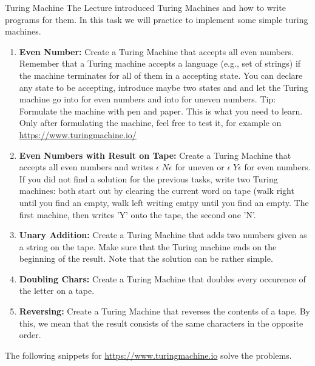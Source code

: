 \begin{task}{Turing Machine}{}{}
The Lecture introduced Turing Machines and how to write programs for
them. In this task we will practice to implement some simple turing
machines.
\begin{enumerate}
\item{\textbf{Even Number:} Create a Turing Machine that accepts all even numbers. Remember that a Turing machine accepts a language (e.g., set of strings) if the machine terminates for all of them in a accepting state. You can declare any state to be accepting, introduce maybe two states  and  and let the Turing machine go into  for even numbers and into  for uneven numbers.
  Tip: Formulate the machine with pen and paper. This is what you need to learn. Only after formulating the machine, feel free to test it, for example on \url{https://www.turingmachine.io/}}
  

  \item{\textbf{Even Numbers with Result on Tape:}
  Create a Turing Machine that accepts all even numbers and writes \(\epsilon \; N \epsilon\) for uneven or
  \(\epsilon \; Y\epsilon\) for even numbers. If you did not find a solution for the previous tasks, write
  two Turing machines: both start out by clearing the current word on tape (walk right until you find an empty, walk left writing emtpy until you find an empty. The first machine, then writes 'Y' onto the tape, the second one 'N'. 
  }

  \item{\textbf{Unary Addition:}
    Create a Turing Machine that adds two numbers given as a string  on the tape. Make sure that the Turing machine ends on the beginning of the result. Note that the solution can be rather simple.
  }

  \item{\textbf{Doubling Chars:}
    Create a Turing Machine that doubles every occurence of the letter  on a tape. }

\item{\textbf{Reversing:} Create a Turing Machine that reverses the contents of a tape. By this, we mean that the result consists of the same characters in the opposite order.
}
  \end{enumerate}

\begin{solution}
  The following snippets for \url{https://www.turingmachine.io} solve the problems.


\end{solution}
\end{task}
